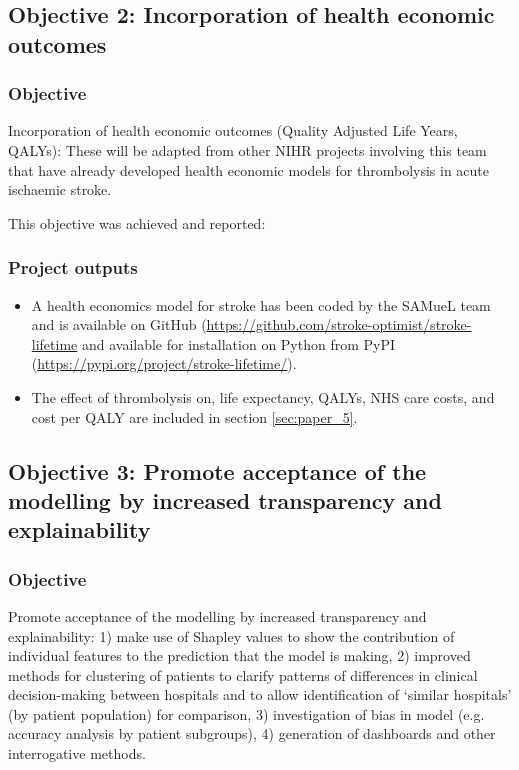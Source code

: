 
\subsection{Objective 2: Incorporation of health economic outcomes}

\subsubsection*{Objective}

Incorporation of health economic outcomes (Quality Adjusted Life Years, QALYs): These will be adapted from other NIHR projects involving this team that have already developed health economic models for thrombolysis in acute ischaemic stroke.

This objective was achieved and reported:

\subsubsection*{Project outputs}

\begin{itemize}
    \item A health economics model for stroke has been coded by the SAMueL team and is available on GitHub (\url{https://github.com/stroke-optimist/stroke-lifetime} and available for installation on Python from PyPI (\url{https://pypi.org/project/stroke-lifetime/}).
    \item The effect of thrombolysis on, life expectancy, QALYs, NHS care costs, and cost per QALY are included in section \ref{sec:paper_5}.
\end{itemize}


\subsection{Objective 3: Promote acceptance of the modelling by increased transparency and explainability}

\subsubsection*{Objective}

Promote acceptance of the modelling by increased transparency and explainability: 1) make use of Shapley values to show the contribution of individual features to the prediction that the model is making, 2) improved methods for clustering of patients to clarify patterns of differences in clinical decision-making between hospitals and to allow identification of ‘similar hospitals’ (by patient population) for comparison, 3) investigation of bias in model (e.g. accuracy analysis by patient subgroups), 4) generation of dashboards and other interrogative methods.


